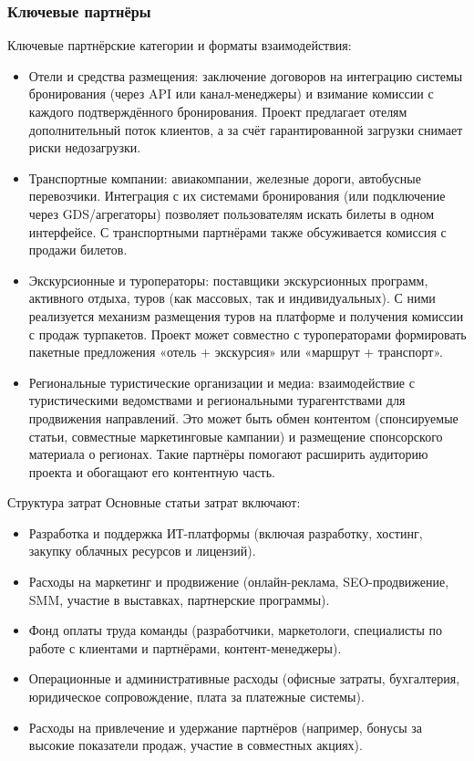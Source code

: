 \subsubsection*{Ключевые партнёры}
Ключевые партнёрские категории и форматы взаимодействия:
\begin{itemize}
    \item Отели и средства размещения: заключение договоров на интеграцию системы бронирования (через API или канал-менеджеры) и взимание комиссии с каждого подтверждённого бронирования. Проект предлагает отелям дополнительный поток клиентов, а за счёт гарантированной загрузки снимает риски недозагрузки.
    \item Транспортные компании: авиакомпании, железные дороги, автобусные перевозчики. Интеграция с их системами бронирования (или подключение через GDS/агрегаторы) позволяет пользователям искать билеты в одном интерфейсе. С транспортными партнёрами также обсуживается комиссия с продажи билетов.
    \item Экскурсионные и туроператоры: поставщики экскурсионных программ, активного отдыха, туров (как массовых, так и индивидуальных). С ними реализуется механизм размещения туров на платформе и получения комиссии с продаж турпакетов. Проект может совместно с туроператорами формировать пакетные предложения «отель + экскурсия» или «маршрут + транспорт».
    \item Региональные туристические организации и медиа: взаимодействие с туристическими ведомствами и региональными турагентствами для продвижения направлений. Это может быть обмен контентом (спонсируемые статьи, совместные маркетинговые кампании) и размещение спонсорского материала о регионах. Такие партнёры помогают расширить аудиторию проекта и обогащают его контентную часть.
\end{itemize}
Структура затрат
Основные статьи затрат включают:
\begin{itemize}
    \item Разработка и поддержка ИТ-платформы (включая разработку, хостинг, закупку облачных ресурсов и лицензий).
    \item Расходы на маркетинг и продвижение (онлайн-реклама, SEO-продвижение, SMM, участие в выставках, партнерские программы).
    \item Фонд оплаты труда команды (разработчики, маркетологи, специалисты по работе с клиентами и партнёрами, контент-менеджеры).
    \item Операционные и административные расходы (офисные затраты, бухгалтерия, юридическое сопровождение, плата за платежные системы).
    \item Расходы на привлечение и удержание партнёров (например, бонусы за высокие показатели продаж, участие в совместных акциях).
\end{itemize}

